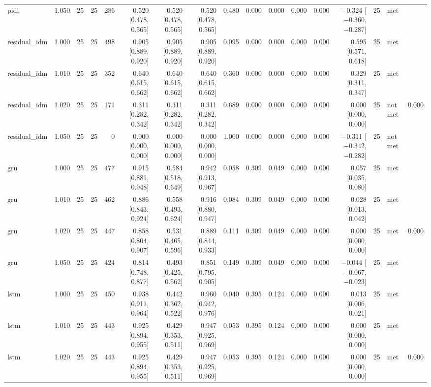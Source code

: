 \begin{table}[htbp]
{\begin{tabular}{lrrrrrrrrrrrrrrlr}
pidl & 1.050 & 25 & 25 & 286 & 0.520 [0.478, 0.565] & 0.520 [0.478, 0.565] & 0.520 [0.478, 0.565] & 0.480 & 0.000 & 0.000 & 0.000 & 0.000 & $-$0.324 [$-$0.360, $-$0.287] & 25 & met &  \\
residual\_idm & 1.000 & 25 & 25 & 498 & 0.905 [0.889, 0.920] & 0.905 [0.889, 0.920] & 0.905 [0.889, 0.920] & 0.095 & 0.000 & 0.000 & 0.000 & 0.000 & 0.595 [0.571, 0.618] & 25 & met &  \\
residual\_idm & 1.010 & 25 & 25 & 352 & 0.640 [0.615, 0.662] & 0.640 [0.615, 0.662] & 0.640 [0.615, 0.662] & 0.360 & 0.000 & 0.000 & 0.000 & 0.000 & 0.329 [0.311, 0.347] & 25 & met &  \\
residual\_idm & 1.020 & 25 & 25 & 171 & 0.311 [0.282, 0.342] & 0.311 [0.282, 0.342] & 0.311 [0.282, 0.342] & 0.689 & 0.000 & 0.000 & 0.000 & 0.000 & 0.000 [0.000, 0.000] & 25 & not met & 0.000 \\
residual\_idm & 1.050 & 25 & 25 & 0 & 0.000 [0.000, 0.000] & 0.000 [0.000, 0.000] & 0.000 [0.000, 0.000] & 1.000 & 0.000 & 0.000 & 0.000 & 0.000 & $-$0.311 [$-$0.342, $-$0.282] & 25 & not met &  \\
gru & 1.000 & 25 & 25 & 477 & 0.915 [0.881, 0.948] & 0.584 [0.518, 0.649] & 0.942 [0.913, 0.967] & 0.058 & 0.309 & 0.049 & 0.000 & 0.000 & 0.057 [0.035, 0.080] & 25 & met &  \\
gru & 1.010 & 25 & 25 & 462 & 0.886 [0.843, 0.924] & 0.558 [0.493, 0.624] & 0.916 [0.880, 0.947] & 0.084 & 0.309 & 0.049 & 0.000 & 0.000 & 0.028 [0.013, 0.042] & 25 & met &  \\
gru & 1.020 & 25 & 25 & 447 & 0.858 [0.804, 0.907] & 0.531 [0.465, 0.596] & 0.889 [0.844, 0.933] & 0.111 & 0.309 & 0.049 & 0.000 & 0.000 & 0.000 [0.000, 0.000] & 25 & met & 0.000 \\
gru & 1.050 & 25 & 25 & 424 & 0.814 [0.748, 0.877] & 0.493 [0.425, 0.562] & 0.851 [0.795, 0.905] & 0.149 & 0.309 & 0.049 & 0.000 & 0.000 & $-$0.044 [$-$0.067, $-$0.023] & 25 & met &  \\
lstm & 1.000 & 25 & 25 & 450 & 0.938 [0.911, 0.964] & 0.442 [0.362, 0.522] & 0.960 [0.942, 0.976] & 0.040 & 0.395 & 0.124 & 0.000 & 0.000 & 0.013 [0.006, 0.021] & 25 & met &  \\
lstm & 1.010 & 25 & 25 & 443 & 0.925 [0.894, 0.955] & 0.429 [0.353, 0.511] & 0.947 [0.925, 0.969] & 0.053 & 0.395 & 0.124 & 0.000 & 0.000 & 0.000 [0.000, 0.000] & 25 & met &  \\
lstm & 1.020 & 25 & 25 & 443 & 0.925 [0.894, 0.955] & 0.429 [0.353, 0.511] & 0.947 [0.925, 0.969] & 0.053 & 0.395 & 0.124 & 0.000 & 0.000 & 0.000 [0.000, 0.000] & 25 & met & 0.000 \\

\end{tabular}}
\end{table}
